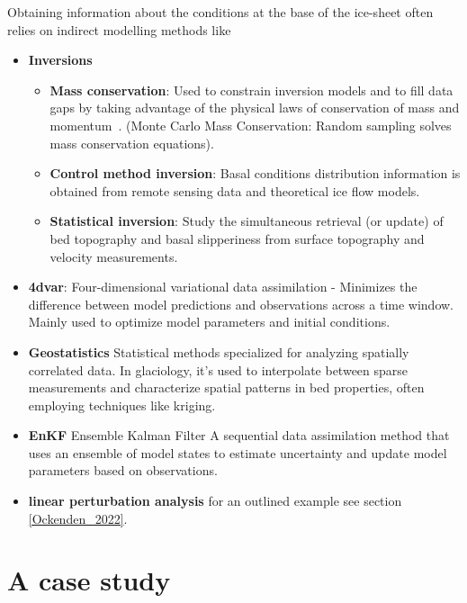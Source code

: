 Obtaining information about the conditions at the base of the ice-sheet often relies on indirect modelling methods like
\begin{itemize}

    \item\textbf{Inversions}
        \begin{itemize}
            \item\textbf{Mass conservation}: Used to constrain inversion models and to fill data gaps by taking advantage of the physical laws of conservation of mass and momentum~\cite{Morlighem_2017, Morlighem_2020}. (Monte Carlo Mass Conservation: Random sampling solves mass conservation equations\cite{Brinkerhoff_2016}).
            \item\textbf{Control method inversion}: Basal conditions distribution information is obtained from remote sensing data and theoretical ice flow models\cite{deRydt_2013}.
            \item\textbf{Statistical inversion}: Study the simultaneous retrieval (or update) of bed topography and basal slipperiness from surface topography and velocity measurements\cite{deRydt_2013}.
        \end{itemize}

    \item\textbf{4dvar}: Four-dimensional variational data assimilation - Minimizes the difference between model predictions and observations across a time window. Mainly used to optimize model parameters and initial conditions\cite{Morlighem_Goldberg_2024}.

    \item\textbf{Geostatistics} Statistical methods specialized for analyzing spatially correlated data. In glaciology, it's used to interpolate between sparse measurements and characterize spatial patterns in bed properties, often employing techniques like kriging\cite{Mackie_2020}.

    \item\textbf{EnKF} Ensemble Kalman Filter A sequential data assimilation method that uses an ensemble of model states to estimate uncertainty and update model parameters based on observations\cite{Morlighem_Goldberg_2024}.

    \item\textbf{linear perturbation analysis} for an outlined example see section \ref{Ockenden_2022}.
\end{itemize} 

\section{A case study}\label{Castleman_2022}
